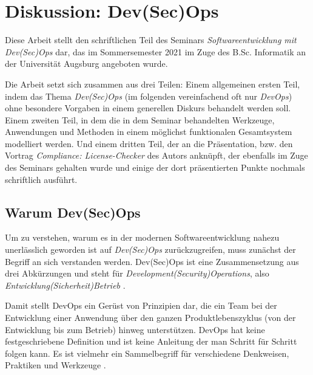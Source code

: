 \chapter{Diskussion: Dev(Sec)Ops}

Diese Arbeit stellt den schriftlichen Teil des Seminars \emph{Softwareentwicklung mit Dev(Sec)Ops} dar, das im Sommersemester 2021 im Zuge des B.Sc. Informatik an der Universität Augsburg angeboten wurde.

Die Arbeit setzt sich zusammen aus drei Teilen: Einem allgemeinen ersten Teil, indem das Thema \emph{Dev(Sec)Ops} (im folgenden vereinfachend oft nur \emph{DevOps}) ohne besondere Vorgaben in einem generellen Diskurs behandelt werden soll. Einem zweiten Teil, in dem die in dem Seminar behandelten Werkzeuge, Anwendungen und Methoden in einem möglichst funktionalen Gesamtsystem modelliert werden. Und einem dritten Teil, der an die Präsentation, bzw. den Vortrag \emph{Compliance: License-Checker} des Autors anknüpft, der ebenfalls im Zuge des Seminars gehalten wurde und einige der dort präsentierten Punkte nochmals schriftlich ausführt.

\section{Warum Dev(Sec)Ops}

Um zu verstehen, warum es in der modernen Softwareentwicklung nahezu unerlässlich geworden ist auf \emph{Dev(Sec)Ops} zurückzugreifen, muss zunächst der Begriff an sich verstanden werden. Dev(Sec)Ops ist eine Zusammensetzung aus drei Abkürzungen und steht für \emph{Development(Security)Operations}, also \emph{Entwicklung(Sicherheit)Betrieb} \cite{forcepointWhatDevSecOpsDefined}. 

Damit stellt DevOps ein Gerüst von Prinzipien dar, die ein Team bei der Entwicklung einer Anwendung über den ganzen Produktlebenszyklus (von der Entwicklung bis zum Betrieb) hinweg unterstützen. DevOps hat keine festgeschriebene Definition und ist keine Anleitung der man Schritt für Schritt folgen kann. Es ist vielmehr ein Sammelbegriff für verschiedene Denkweisen, Praktiken und Werkzeuge \cite{awsWasIstDevOps}.

